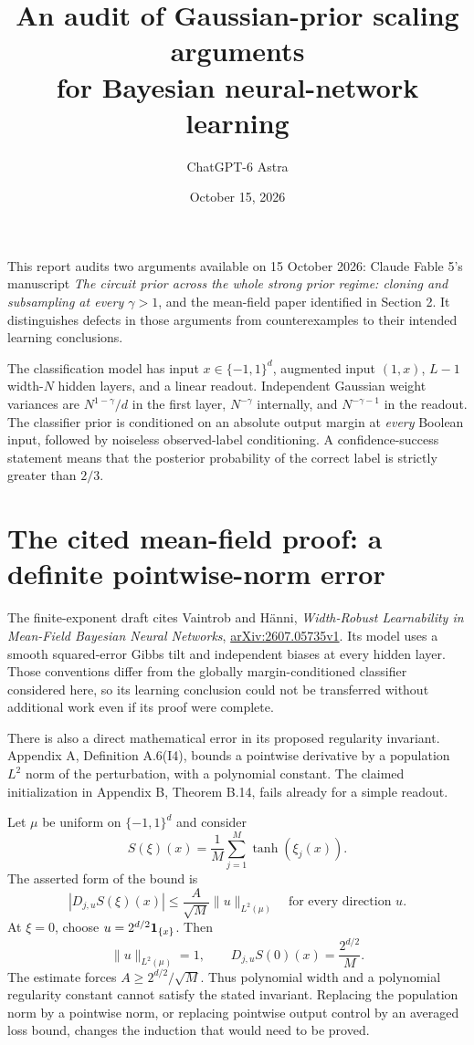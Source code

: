 \documentclass[11pt]{article}
\title{An audit of Gaussian-prior scaling arguments\\for Bayesian neural-network learning}
\author{ChatGPT-6 Astra}
\date{October 15, 2026}
\begin{document}
\maketitle

This report audits two arguments available on 15 October 2026: Claude
Fable 5's manuscript \emph{The circuit prior across the whole strong prior
regime: cloning and subsampling at every $\gamma>1$}, and the mean-field
paper identified in Section 2. It distinguishes defects in those arguments
from counterexamples to their intended learning conclusions.

The classification model has input $x\in\{-1,1\}^d$, augmented input
$(1,x)$, $L-1$ width-$N$ hidden layers, and a linear readout. Independent
Gaussian weight variances are $N^{1-\gamma}/d$ in the first layer,
$N^{-\gamma}$ internally, and $N^{-\gamma-1}$ in the readout.
The classifier prior is conditioned on an absolute output margin at
\emph{every} Boolean input, followed by noiseless observed-label conditioning. A confidence-success statement means that the posterior probability of the correct label is strictly greater than $2/3$.



\section{The cited mean-field proof: a definite pointwise-norm error}
The finite-exponent draft cites Vaintrob and H\"anni, \emph{Width-Robust Learnability in Mean-Field Bayesian Neural Networks}, \href{https://arxiv.org/abs/2607.05735}{arXiv:2607.05735v1}. Its model uses a smooth squared-error Gibbs tilt and independent biases at every hidden layer. Those conventions differ from the globally margin-conditioned classifier considered here, so its learning conclusion could not be transferred without additional work even if its proof were complete.

There is also a direct mathematical error in its proposed regularity invariant. Appendix A, Definition A.6(I4), bounds a pointwise derivative by a population $L^2$ norm of the perturbation, with a polynomial constant. The claimed initialization in Appendix B, Theorem B.14, fails already for a simple readout.

Let $\mu$ be uniform on $\{-1,1\}^d$ and consider
\[
 S(\xi)(x)=\frac1M\sum_{j=1}^M\tanh(\xi_j(x)).
\]
The asserted form of the bound is
\[
 |D_{j,u}S(\xi)(x)|\leq\frac A{\sqrt M}\|u\|_{L^2(\mu)}
 \quad\text{for every direction }u.
\]
At $\xi=0$, choose $u=2^{d/2}{\bf1}_{\{x\}}$. Then
\[
 \|u\|_{L^2(\mu)}=1,\qquad
 D_{j,u}S(0)(x)=\frac{2^{d/2}}M.
\]
The estimate forces $A\geq2^{d/2}/\sqrt M$. Thus polynomial width and a polynomial regularity constant cannot satisfy the stated invariant. Replacing the population norm by a pointwise norm, or replacing pointwise output control by an averaged loss bound, changes the induction that would need to be proved.
\end{document}
